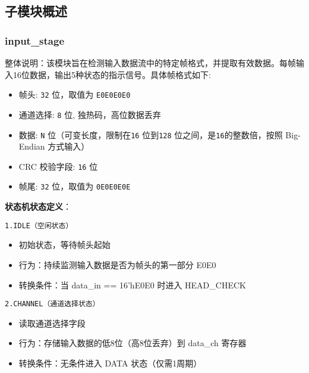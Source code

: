 \documentclass[12pt,]{article}
\begin{document}
\hypertarget{ux5b50ux6a21ux5757ux6982ux8ff0}{%
\subsection{子模块概述}\label{ux5b50ux6a21ux5757ux6982ux8ff0}}

\hypertarget{input_stage}{%
\subsubsection{input\_stage}\label{input_stage}}

整体说明：该模块旨在检测输入数据流中的特定帧格式，并提取有效数据。每帧输入16位数据，输出5种状态的指示信号。具体帧格式如下:

\begin{itemize}
\item
  帧头: \texttt{32} 位，取值为 \texttt{E0E0E0E0}
\item
  通道选择: \texttt{8} 位, 独热码，高位数据丢弃
\item
  数据: \texttt{N} 位（可变长度，限制在\texttt{16} 位到\texttt{128}
  位之间，是\texttt{16}的整数倍，按照 Big-Endian 方式输入）
\item
  CRC 校验字段: \texttt{16} 位
\item
  帧尾: \texttt{32} 位，取值为 \texttt{0E0E0E0E}
\end{itemize}

\textbf{状态机状态定义}：

\texttt{1.\hspace{0pt}IDLE\hspace{0pt}（空闲状态）}

\begin{itemize}
\item
  初始状态，等待帧头起始
\item
  行为：持续监测输入数据是否为帧头的第一部分 E0E0
\item
  转换条件：当 data\_in == 16'hE0E0 时进入 HEAD\_CHECK
\end{itemize}


\texttt{2.\hspace{0pt}CHANNEL\hspace{0pt}（通道选择状态）}

\begin{itemize}
\item
  读取通道选择字段
\item
  行为：存储输入数据的低8位（高8位丢弃）到 data\_ch 寄存器
\item
  转换条件：无条件进入 DATA 状态（仅需1周期）
\end{itemize}
\end{document}
